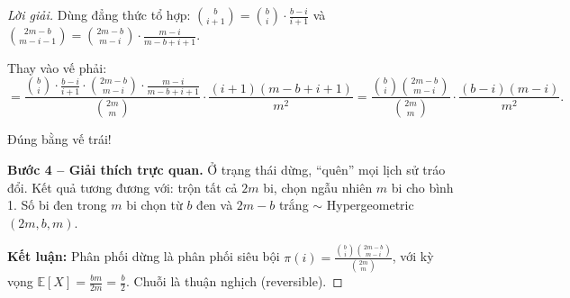 \documentclass[8pt,a4paper]{article}
\newenvironment{solution}{\begin{proof}[Lời giải]}{\end{proof}}
\newcommand{\E}{\mathbb{E}}
\begin{document}
\begin{solution}
Dùng đẳng thức tổ hợp: $\binom{b}{i+1} = \binom{b}{i} \cdot \frac{b-i}{i+1}$ và $\binom{2m-b}{m-i-1} = \binom{2m-b}{m-i} \cdot \frac{m-i}{m-b+i+1}$.

Thay vào vế phải:
\[
  = \frac{\binom{b}{i} \cdot \frac{b-i}{i+1} \cdot \binom{2m-b}{m-i} \cdot \frac{m-i}{m-b+i+1}}{\binom{2m}{m}} \cdot \frac{(i+1)(m-b+i+1)}{m^2} = \frac{\binom{b}{i}\binom{2m-b}{m-i}}{\binom{2m}{m}} \cdot \frac{(b-i)(m-i)}{m^2}.
\]

Đúng bằng vế trái! \checkmark

\textbf{Bước 4 -- Giải thích trực quan.}
Ở trạng thái dừng, ``quên'' mọi lịch sử tráo đổi. Kết quả tương đương với: trộn tất cả $2m$ bi, chọn ngẫu nhiên $m$ bi cho bình 1. Số bi đen trong $m$ bi chọn từ $b$ đen và $2m-b$ trắng $\sim$ Hypergeometric$(2m, b, m)$.

\textbf{Kết luận:} Phân phối dừng là phân phối siêu bội $\pi(i) = \frac{\binom{b}{i}\binom{2m-b}{m-i}}{\binom{2m}{m}}$, với kỳ vọng $\E[X] = \frac{bm}{2m} = \frac{b}{2}$. Chuỗi là thuận nghịch (reversible).
\end{solution}
\end{document}
